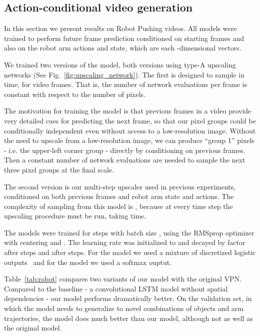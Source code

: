 \documentclass{article}
\begin{document}
\subsection{Action-conditional video generation}
In this section we present results on Robot Pushing videos.
All models were trained to perform future frame prediction conditioned on  starting frames and also on the robot arm actions and state, which are each -dimensional vectors.


We trained two versions of the model, both versions using type-A upscaling networks (See Fig.~\ref{fig:upscaling_network}).
The first is designed to sample in  time, for  video frames.
That is, the number of network evaluations per frame is constant with respect to the number of pixels.


The motivation for training the  model is that previous frames in a video provide very detailed cues for predicting the next frame, so that our pixel groups could be conditionally independent even without access to a low-resolution image.
Without the need to upscale from a low-resolution image, we can produce ``group 1'' pixels - i.e. the upper-left corner group - directly by conditioning on previous frames.
Then a constant number of network evaluations are needed to sample the next three pixel groups at the final scale.

The second version is our multi-step upscaler used in previous experiments, conditioned on both previous frames and robot arm state and actions.
The complexity of sampling from this model is , because at every time step the upscaling procedure must be run, taking  time.


The models were trained for  steps with batch size , using the RMSprop optimizer with centering and .
The learning rate was initialized to  and decayed by factor  after  steps and after  steps.
For the  model we used a mixture of discretized logistic outputs~\cite{salimans2017pixelcnn} and for the  model we used a softmax ouptut.





Table~\ref{tab:robot} compares two variants of our model with the original VPN.
Compared to the  baseline - a convolutional LSTM model without spatial dependencies - our  model performs dramatically better.
On the validation set, in which the model needs to generalize to novel combinations of objects and arm trajectories, the  model does much better than our  model, although not as well as the original  model.
\end{document}
